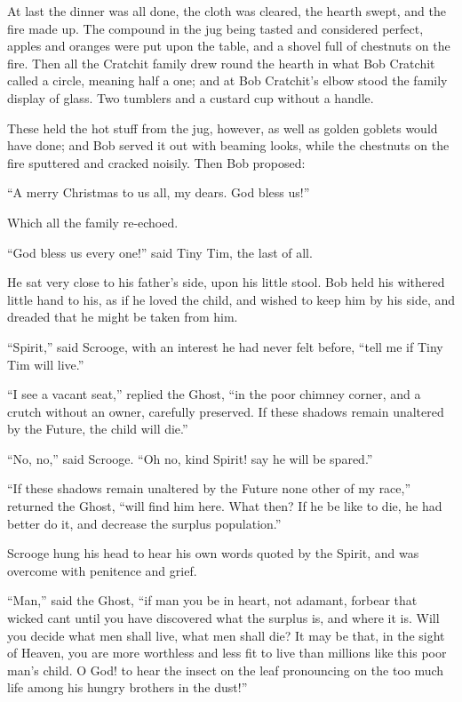 \documentclass[paper=5.5in:8.5in,BCOR=10mm,twoside,DIV=15,12pt,usegeometry,openany]{scrbook} %
\begin{document}
At last the dinner was all done, the cloth was cleared, the hearth swept, and the fire made up. The compound in the jug being tasted and considered perfect, apples and oranges were put upon the table, and a shovel full of chestnuts on the fire. Then all the Cratchit family drew round the hearth in what Bob Cratchit called a circle, meaning half a one; and at Bob Cratchit's elbow stood the family display of glass. Two tumblers and a custard cup without a handle.

These held the hot stuff from the jug, however, as well as golden goblets would have done; and Bob served it out with beaming looks, while the chestnuts on the fire sputtered and cracked noisily. Then Bob proposed:

\enquote{A merry Christmas to us all, my dears. God bless us!}

Which all the family re-echoed.

\enquote{God bless us every one!} said Tiny Tim, the last of all.

He sat very close to his father's side, upon his little stool. Bob held his withered little hand to his, as if he loved the child, and wished to keep him by his side, and dreaded that he might be taken from him.

\enquote{Spirit,} said Scrooge, with an interest he had never felt before, \enquote{tell me if Tiny Tim will live.}

\enquote{I see a vacant seat,} replied the Ghost, \enquote{in the poor chimney corner, and a crutch without an owner, carefully preserved. If these shadows remain unaltered by the Future, the child will die.}

\enquote{No, no,} said Scrooge. \enquote{Oh no, kind Spirit! say he will be spared.}

\enquote{If these shadows remain unaltered by the Future none other of my race,} returned the Ghost, \enquote{will find him here. What then? If he be like to die, he had better do it, and decrease the surplus population.}

Scrooge hung his head to hear his own words quoted by the Spirit, and was overcome with penitence and grief.

\enquote{Man,} said the Ghost, \enquote{if man you be in heart, not adamant, forbear that wicked cant until you have discovered what the surplus is, and where it is. Will you decide what men shall live, what men shall die? It may be that, in the sight of Heaven, you are more worthless and less fit to live than millions like this poor man's child. O God! to hear the insect on the leaf pronouncing on the too much life among his hungry brothers in the dust!}
\end{document}
